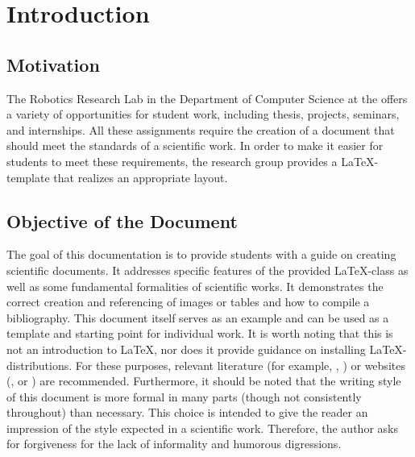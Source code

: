 \chapter{Introduction}
\label{chap:intro}

\section{Motivation}
\label{sec:intro:motiv}
The Robotics Research Lab in the Department of Computer Science at the \RPTU offers a variety of opportunities for student work, including thesis, projects, seminars, and internships. All these assignments require the creation of a document that should meet the standards of a scientific work. In order to make it easier for students to meet these requirements, the research group provides a \LaTeX-template that realizes an appropriate layout.

\section{Objective of the Document}
\label{sec:intro:goal}
The goal of this documentation is to provide students with a guide on creating scientific documents. It addresses specific features of the provided \LaTeX-class as well as some fundamental formalities of scientific works. It demonstrates the correct creation and referencing of images or tables and how to compile a bibliography. This document itself serves as an example and can be used as a template and starting point for individual work. It is worth noting that this is not an introduction to \LaTeX, nor does it provide guidance on installing \LaTeX-distributions. For these purposes, relevant literature (for example, \cite{Lamport95}, \cite{Goossens96}) or websites (\cite{WWWDante}, \cite{WWWMikTex} or \cite{WWWPospiech}) are recommended. Furthermore, it should be noted that the writing style of this document is more formal in many parts (though not consistently throughout) than necessary. This choice is intended to give the reader an impression of the style expected in a scientific work. Therefore, the author asks for forgiveness for the lack of informality and humorous digressions.

